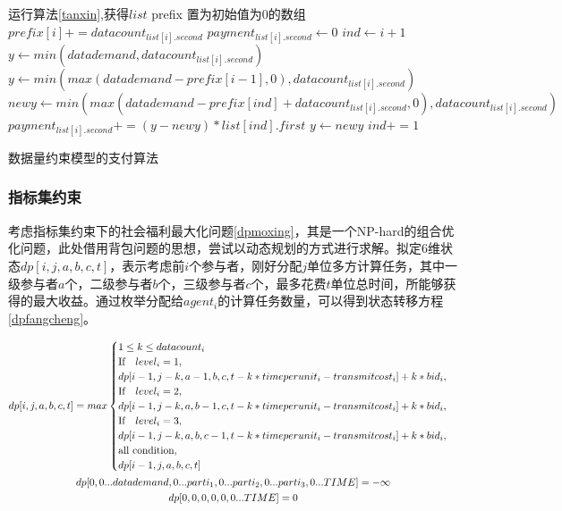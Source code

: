 \documentclass[promaster]{thesis-uestc}
\begin{document}
\begin{algorithm}[h]
    运行算法\ref{tanxin},获得$list$\;
    prefix 置为初始值为0的数组\;
    {
        $prefix[i]  += datacount_{list[i].second}$\;
    }
    {
        $payment_{list[i].second} \leftarrow 0$\;
        $ind \leftarrow i + 1$
        {
            $y \leftarrow min(datademand,datacount_{list[i].second})$\;
        }{
        $y \leftarrow min(max(datademand - prefix[i-1],0),datacount_{list[i].second})$\;
        }
        {
            $newy \leftarrow min(max(datademand - prefix[ind]+ datacount_{list[i].second},0),datacount_{list[i].second})$\;
            $payment_{list[i].second} += (y - newy)*list[ind].first$\;
            $y \leftarrow newy$\;
            $ind += 1$\;
        }
    }
\caption{数据量约束模型的支付算法}
\label{tanxin_zhifu}
\end{algorithm}

\FloatBarrier

\subsubsection{指标集约束}
\label{dptou}

考虑指标集约束下的社会福利最大化问题\ref{dpmoxing}，其是一个NP-hard的组合优化问题，此处借用背包问题的思想，尝试以动态规划的方式进行求解。拟定6维状态$dp[i,j,a,b,c,t]$，表示考虑前$i$个参与者，刚好分配$j$单位多方计算任务，其中一级参与者$a$个，二级参与者$b$个，三级参与者$c$个，最多花费$t$单位总时间，所能够获得的最大收益。通过枚举分配给$agent_i$的计算任务数量，可以得到状态转移方程\ref{dpfangcheng}。

\begin{gather}
\label{dpfangcheng}  
dp[i,j,a,b,c,t] = max
\begin{cases}
1 \leq k \leq datacount_i \\
\text{If} \quad level_i = 1,\\
dp[i-1,j-k,a-1,b,c,t-k*timeperunit_i-transmitcost_i]+ k*bid_i,\\
\text{If}\quad level_i = 2,\\
dp[i-1,j-k,a,b-1,c,t-k*timeperunit_i-transmitcost_i]+ k*bid_i,\\
\text{If} \quad level_i = 3,\\
dp[i-1,j-k,a,b,c-1,t-k*timeperunit_i-transmitcost_i]+ k*bid_i,\\
\text{all condition},\\
dp[i-1,j,a,b,c,t]
\end{cases}\\
dp[0,0...datademand,0...parti_1,0...parti_2,0...parti_3,0...TIME] =-\infty \notag\\
dp[0,0,0,0,0,0...TIME] = 0 \notag
\end{gather}
\end{document}
